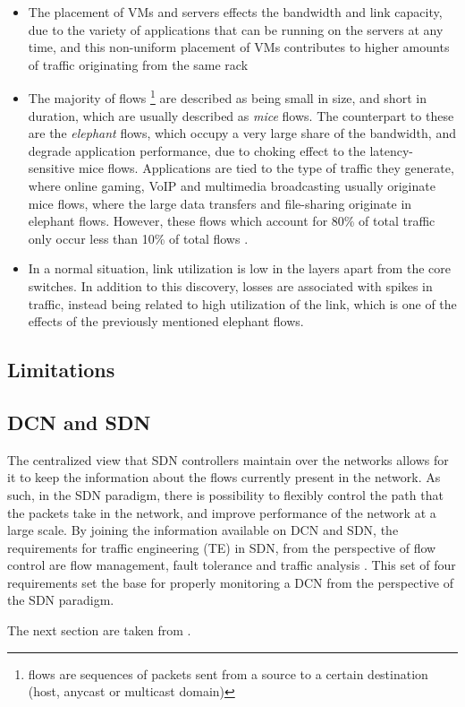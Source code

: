 \begin {itemize}
    \item The placement of VMs and servers effects the bandwidth and link capacity, due to the variety of applications that can be running on the servers at any time, and this non-uniform placement of VMs contributes to higher
        amounts of traffic originating from the same rack
    \item The majority of flows \footnote {flows are sequences of packets sent from a source to a certain destination (host, anycast or multicast domain)} are described as being small in size, and short in duration,
        which are usually described as \textit {mice} flows. 
        The counterpart to these are the \textit {elephant} flows, which occupy a very large share of the bandwidth, and degrade application performance, due to choking effect to the latency-sensitive mice flows. 
        Applications are tied to the type of traffic they generate, where online gaming, VoIP and multimedia broadcasting usually originate mice flows, where the large data transfers and file-sharing originate in elephant flows. 
        However, these flows which account for 80\% of total traffic only occur less than 10\% of total flows \cite {CITE - Broadcom Engineered Elephant flow for boosting ... }.
    \item In a normal situation, link utilization is low in the layers apart from the core switches. In addition to this discovery, losses are associated with spikes in traffic, instead being related to high utilization 
        of the link, which is one of the effects of the previously mentioned elephant flows.
\end {itemize}

\subsection {Limitations}

\subsection {DCN and SDN}

\par The centralized view that SDN controllers maintain over the networks allows for it to keep the information about the flows currently present in the network. As such, in the SDN paradigm, there is possibility to flexibly control 
the path that the packets take in the network, and improve performance of the network at a large scale. By joining the information available on DCN and SDN, the requirements for traffic engineering (TE) in SDN, from
the perspective of flow control are flow management, fault tolerance and traffic analysis \cite { CITE - traffic_engineering_sdn}. This set of four requirements set the base for properly monitoring a DCN from the 
perspective of the SDN paradigm.
\par The next section are taken from \cite { CITE - traffic_engineering_sdn}.

